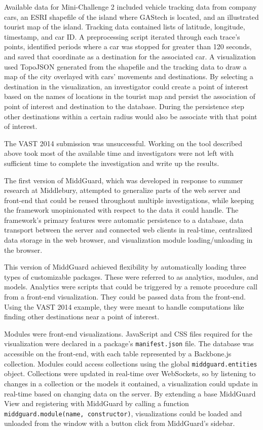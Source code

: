 Available data for Mini-Challenge 2 included vehicle tracking data from
company cars, an ESRI shapefile of the island where GAStech is located, and an
illustrated tourist map of the island. Tracking data contained lists of
latitude, longitude, timestamp, and car ID. A preprocessing script iterated
through each trace's points, identified periods where a car was stopped for
greater than 120 seconds, and saved that coordinate as a destination for the
associated car. A visualization used TopoJSON \cite{topojson-spec} generated
from the shapefile and the tracking data to draw a map of the city overlayed
with cars' movements and destinations. By selecting a destination in the
visualization, an investigator could create a point of interest based on the
names of locations in the tourist map and persist the association of point of
interest and destination to the database. During the persistence step other
destinations within a certain radius would also be associate with that point of
interest.

The VAST 2014 submission was unsuccessful. Working on the tool described above
took most of the available time and investigators were not left with sufficient
time to complete the investigation and write up the results.

The first version of MiddGuard, which was developed in response to summer
research at Middlebury, attempted to generalize parts of the web server and
front-end that could be reused throughout multiple investigations, while keeping
the framework unopinionated with respect to the data it could handle. The
framework's primary features were automatic persistence to a database, data
transport between the server and connected web clients in real-time, centralized
data storage in the web browser, and visualization module loading/unloading in
the browser.

This version of MiddGuard achieved flexibility by automatically loading three
types of customizable packages. These were referred to as analytics, modules,
and models. Analytics were scripts that could be triggered by a remote procedure
call from a front-end visualization. They could be passed data from the
front-end. Using the VAST 2014 example, they were meant to handle computations
like finding other destinations near a point of interest.

Modules were front-end visualizations. JavaScript and CSS files required for the
visualization were declared in a package's \texttt{manifest.json} file. The
database was accessible on the front-end, with each table represented by a
Backbone.js collection. Modules could access collections using the global
\texttt{middguard.entities} object. Collections were updated in real-time over
WebSockets, so by listening to changes in a collection or the models it
contained, a visualization could update in real-time based on changing data on
the server. By extending a base MiddGuard View \cite{backbone} and registering
with MiddGuard by calling a function \texttt{middguard.module(name,
constructor)}, visualizations could be loaded and unloaded from the window with
a button click from MiddGuard's sidebar.


